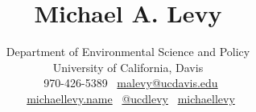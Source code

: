 \documentclass[11pt, letter]{article}
\title{Michael A. Levy}
\author{Department of Environmental Science and Policy\\
University of California, Davis\\ 
\faMobilePhone~970-426-5389 \textbar{} \faEnvelope~\href{mailto:malevy@ucdavis.edu}{malevy@ucdavis.edu}\\
\faLaptop~\href{http://michaellevy.name}{michaellevy.name} \textbar{} \faTwitter~\href{http://twitter.com/ucdlevy}{@ucdlevy} \textbar{} \faGithub~\href{https://github.com/michaellevy}{michaellevy}
}
\date{} %
\begin{document}
\maketitle
\begin{raggedright}
\vspace{-15mm}



\end{raggedright}
\end{document}
